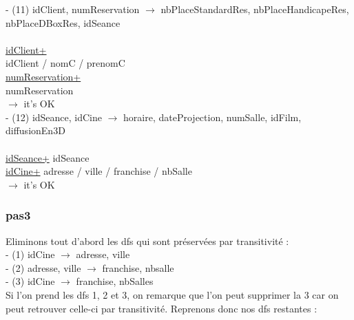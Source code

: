 \documentclass[a4paper,sffamily,12pt]{article}
\begin{document}
				\noindent - (11) idClient, numReservation $\rightarrow$ nbPlaceStandardRes, nbPlaceHandicapeRes, nbPlaceDBoxRes, idSeance \\
					\\
					\underline{idClient+} \\
					idClient / nomC / prenomC \\
					\underline{numReservation+} \\
					numReservation \\	
				$\rightarrow$ it's OK \\					
				
				\noindent - (12) idSeance, idCine $\rightarrow$ horaire, dateProjection, numSalle, idFilm, diffusionEn3D \\												
					\\
					\underline{idSeance+}
					idSeance \\
					\underline{idCine+}
					adresse / ville / franchise / nbSalle \\
				$\rightarrow$ it's OK \\

				\vspace{0.5cm}

			\subsubsection{pas3}		
	
				\vspace{0.5cm}
	
				\noindent Eliminons tout d'abord les dfs qui sont préservées par transitivité : \\
	
					\noindent- (1) idCine $\rightarrow$ adresse, ville \\
					- (2) adresse, ville $\rightarrow$ franchise, nbsalle \\
					- (3) idCine $\rightarrow$ franchise, nbSalles \\
					
					Si l'on prend les dfs 1, 2 et 3, on remarque que l'on peut supprimer la 3 car on peut retrouver celle-ci par transitivité. Reprenons donc nos dfs restantes : \\
					
\end{document}
